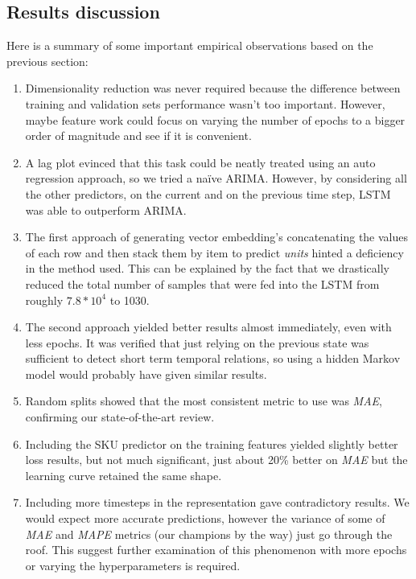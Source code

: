 \documentclass[]{article}
\providecommand{\tightlist}{%
  \setlength{\itemsep}{0pt}\setlength{\parskip}{0pt}}
\theoremstyle{definition}
\theoremstyle{definition}
\theoremstyle{definition}
\theoremstyle{remark}
\begin{document}
\subsection{Results discussion}\label{results-discussion}

Here is a summary of some important empirical observations based on the
previous  section:

\begin{enumerate}
\def\labelenumi{\arabic{enumi}.}
\tightlist
\item
  Dimensionality reduction was never required because the difference
  between training and validation sets performance wasn't too important.
  However, maybe feature work could focus on varying the number of
  epochs to a bigger order of magnitude and see if it is convenient.
\item
  A lag plot evinced that this task could be neatly treated using an
  auto regression approach, so we tried a naïve ARIMA. However, by
  considering all the other predictors, on the current and on the
  previous time step, LSTM was able to outperform ARIMA.
\item
  The first approach of generating vector embedding's concatenating the
  values of each row and then stack them by item to predict \emph{units}
  hinted a deficiency in the method used. This can be explained by the
  fact that we drastically reduced the total number of samples that were
  fed into the LSTM from roughly \(7.8*10^4\) to 1030.
\item
  The second approach yielded better results almost immediately, even
  with less epochs. It was verified that just relying on the previous
  state was sufficient to detect short term temporal relations, so using
  a hidden Markov model would probably have given similar results.
\item
  Random splits showed that the most consistent metric to use was
  \emph{MAE}, confirming our state-of-the-art review.
\item
  Including the SKU predictor on the training features yielded slightly
  better loss results, but not much significant, just about 20\% better
  on \emph{MAE} but the learning curve retained the same shape.
\item
  Including more timesteps in the representation gave contradictory
  results. We would expect more accurate predictions, however the
  variance of some of \emph{MAE} and \emph{MAPE} metrics (our champions
  by the way) just go through the roof. This suggest further examination
  of this phenomenon with more epochs or varying the hyperparameters is
  required.
\end{enumerate}
\end{document}
